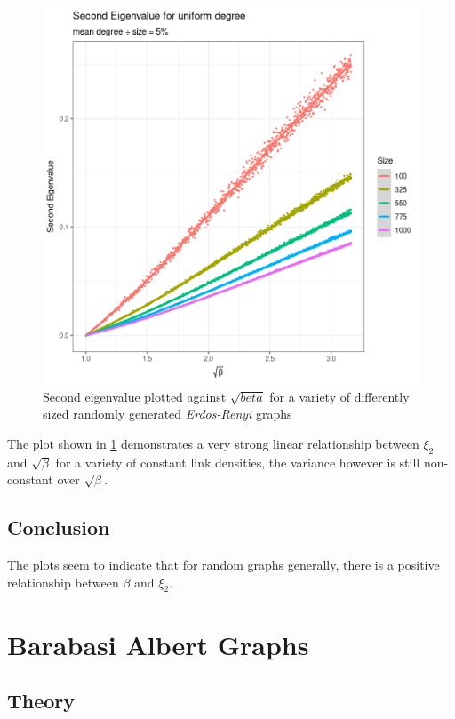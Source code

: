 \documentclass[11pt, twoside]{report}
\begin{document}
\begin{figure}[htbp]
\centering
\includegraphics[width=12cm]{media/constant_dens_erdos_density_sqrt.png}
\caption{\label{fig:constant_dens_erdos_density_sqrt} Second eigenvalue plotted against \(\sqrt{beta}\) for a variety of differently sized randomly generated \textit{Erdos-Renyi} graphs}
\end{figure}


The plot shown in \ref{fig:constant_dens_erdos_density_sqrt}  demonstrates a very strong linear relationship between \(\xi_{2}\) and \(\sqrt{\beta}\) for a variety of constant link densities, the variance however is still non-constant over \(\sqrt{\beta}\).


\subsection{Conclusion}
The plots seem to indicate that for random graphs generally, there is a positive relationship between \(\beta\) and \(\xi_{2}\).
\section{Barabasi Albert Graphs}
\label{barabassi-albert}
\subsection{Theory}
\label{sec:org295fb32}
\end{document}
